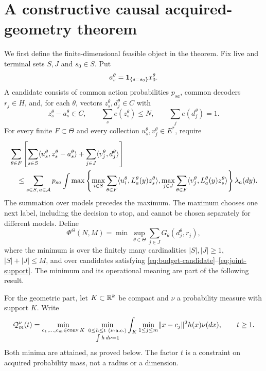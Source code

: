 \section{A constructive causal acquired-geometry theorem}\label{sec:central}
We first define the finite-dimensional feasible object in the theorem. Fix live and terminal sets $S,J$ and $s_0\in S$. Put
\[
 a_s^\theta=\mathbf 1_{\{s=s_0\}}x_0^\theta.
\]
A candidate consists of common action probabilities $p_{sa}$, common decoders $r_j\in H$, and, for each $\theta$, vectors $z_s^\theta,d_j^\theta\in C$ with
\begin{equation}\label{eq:budget-candidate}
 z_s^\theta-a_s^\theta\in C,\qquad
 \sum_s e(z_s^\theta)\le N,\qquad
 \sum_j e(d_j^\theta)=1.
\end{equation}
For every finite $F\subset\Theta$ and every collection $u_s^\theta,v_j^\theta\in E^*$, require
\begin{align}
 &\sum_{\theta\in F}\left[
   \sum_{s\in S}\langle u_s^\theta,z_s^\theta-a_s^\theta\rangle
       +\sum_{j\in J}\langle v_j^\theta,d_j^\theta\rangle\right]\notag\\
 &\quad\le\sum_{s\in S,\,a\in\mathcal A}p_{sa}
    \int \max\left\{
      \max_{i\in S}\sum_{\theta\in F}\langle u_i^\theta,L_a^\theta(y)z_s^\theta\rangle,
      \max_{j\in J}\sum_{\theta\in F}\langle v_j^\theta,L_a^\theta(y)z_s^\theta\rangle
              \right\}\lambda_a(dy).\label{eq:joint-support}
\end{align}
The summation over models precedes the maximum. The maximum chooses one next label, including the decision to stop, and cannot be chosen separately for different models. Define
\begin{equation}\label{eq:Phi}
 \Phi^\Theta(N,M)=
 \min\ \sup_{\theta\in\Theta}\sum_{j\in J}G_\theta(d_j^\theta,r_j),
\end{equation}
where the minimum is over the finitely many cardinalities $|S|,|J|\ge1$, $|S|+|J|\le M$, and over candidates satisfying \eqref{eq:budget-candidate}--\eqref{eq:joint-support}. The minimum and its operational meaning are part of the following result.

For the geometric part, let $K\subset\mathbb R^k$ be compact and $\nu$ a probability measure with support $K$. Write
\begin{equation}\label{eq:profile}
 \mathcal Q_m^\nu(t)=\min_{c_1,\ldots,c_m\in\operatorname{conv} K}
 \ \min_{\substack{0\le h\le t\ (\nu\text{-a.e.})\\\int h\,d\nu=1}}
       \int_K\min_{1\le j\le m}\lVert x-c_j\rVert^2h(x)\nu(dx),
 \qquad t\ge1.
\end{equation}
Both minima are attained, as proved below. The factor $t$ is a constraint on acquired probability mass, not a radius or a dimension.

